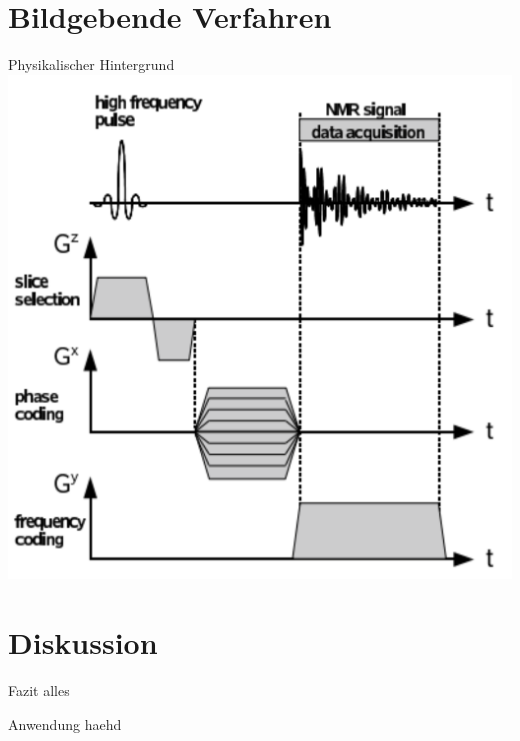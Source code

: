 \section{Bildgebende Verfahren} %
\begin{frame}{Physikalischer Hintergrund}
\includegraphics[scale=.1]{images//signal.png}
\end{frame}




\section{Diskussion}
\begin{frame}{Fazit}
alles
\end{frame}

\begin{frame}{Anwendung}
haehd
\end{frame}